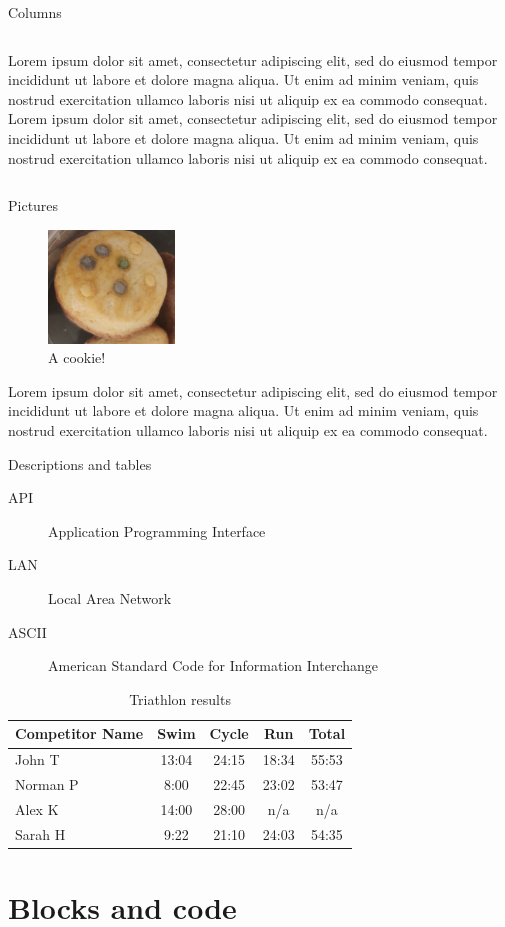 \documentclass[aspectratio=169]{beamer}
\newcommand{\lorem}{Lorem ipsum dolor sit amet, consectetur adipiscing elit, sed do eiusmod tempor incididunt ut labore et dolore magna aliqua. Ut enim ad minim veniam, quis nostrud exercitation ullamco laboris nisi ut aliquip ex ea commodo consequat.}
\begin{document}
\begin{frame}{Columns}
\label{columns}
\begin{columns}
\lorem
{}
\lorem
\end{columns}
\end{frame}

\begin{frame}{Pictures}
\label{figures}
\begin{figure}
\includegraphics[width=0.3\textwidth]{img/cookie}
\caption{A cookie!}
\end{figure}
\lorem
\end{frame}

\begin{frame}{Descriptions and tables}
    \begin{description}
        \item[API] Application Programming Interface
        \item[LAN] Local Area Network
        \item[ASCII] American Standard Code for Information Interchange
    \end{description}

    \begin{table}
        \begin{tabular}{l | c | c | c | c }
        Competitor Name & Swim & Cycle & Run & Total \\
        \hline \hline
        John T & 13:04 & 24:15 & 18:34 & 55:53 \\ 
        Norman P & 8:00 & 22:45 & 23:02 & 53:47\\
        Alex K & 14:00 & 28:00 & n/a & n/a\\
        Sarah H & 9:22 & 21:10 & 24:03 & 54:35 
        \end{tabular}
        \caption{Triathlon results}
    \end{table}
\end{frame}



\section{Blocks and code}
\end{document}

